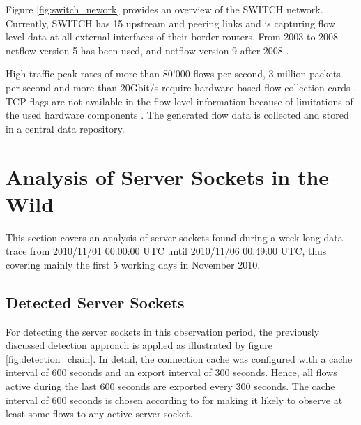 Figure \ref{fig:switch_nework} provides an overview of the SWITCH network. 
Currently, SWITCH has 15 upstream and peering links and is capturing flow level data at all external interfaces of their border routers. From 2003 to 2008 \gls{netflow} version 5 has been used, and \gls{netflow} version 9 after 2008 \citep{Schatzmann:Tracing}.

High traffic peak rates of more than 80'000 flows per second, 3 million packets per second and more than 20Gbit/s require hardware-based flow collection cards \citep{Schatzmann:Tracing}. 
\gls{TCP} flags are not available in the flow-level information because of limitations of the used hardware components \citep{Schatzmann:Tracing}. 
The generated flow data is collected and stored in a central data repository.

\section{Analysis of Server Sockets in the Wild\label{section:analysis_in_wild}}

This section covers an analysis of \glspl{server socket} found during a week long data trace from 2010/11/01 00:00:00 UTC until 2010/11/06 00:49:00 UTC, thus covering mainly the first 5 working days in November 2010.

\subsection{Detected Server Sockets}

For detecting the \glspl{server socket} in this observation period, the previously discussed detection approach is applied as illustrated by figure \ref{fig:detection_chain}. 
In detail, the connection cache was configured with a cache interval of 600 seconds and an export interval of 300 seconds. Hence, all flows active during the last 600 seconds are exported every 300 seconds. The cache interval of 600 seconds is chosen according to \citet{Schatzmann:Tracing} for making it likely to observe at least some flows to any active server socket. 

